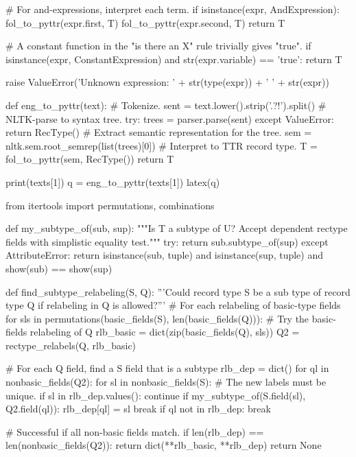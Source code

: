 \begin{cell}
    # For and-expressions, interpret each term.
    if isinstance(expr, AndExpression):
        fol_to_pyttr(expr.first, T)
        fol_to_pyttr(expr.second, T)
        return T
    
    # A constant function in the "is there an X" rule trivially gives "true".
    if isinstance(expr, ConstantExpression) and str(expr.variable) == 'true':
        return T
    
    raise ValueError('Unknown expression: ' + str(type(expr)) + ' ' + str(expr))

def eng_to_pyttr(text):
    # Tokenize.
    sent = text.lower().strip('.?!').split()
    # NLTK-parse to syntax tree.
    try:
        trees = parser.parse(sent)
    except ValueError:
        return RecType()
    # Extract semantic representation for the tree.
    sem = nltk.sem.root_semrep(list(trees)[0])
    # Interpret to TTR record type.
    T = fol_to_pyttr(sem, RecType())
    return T

print(texts[1])
q = eng_to_pyttr(texts[1])
latex(q)
\end{cell}

\begin{cell}
from itertools import permutations, combinations

def my_subtype_of(sub, sup):
    """Is T a subtype of U? Accept dependent rectype fields with simplistic equality test."""
    try:
        return sub.subtype_of(sup)
    except AttributeError:
        return isinstance(sub, tuple) and isinstance(sup, tuple) and show(sub) == show(sup)

def find_subtype_relabeling(S, Q):
    '''Could record type S be a sub type of record type Q if relabeling in Q is allowed?'''
    # For each relabeling of basic-type fields
    for sls in permutations(basic_fields(S), len(basic_fields(Q))):
        # Try the basic-fields relabeling of Q
        rlb_basic = dict(zip(basic_fields(Q), sls))
        Q2 = rectype_relabels(Q, rlb_basic)
        
        # For each Q field, find a S field that is a subtype
        rlb_dep = dict()
        for ql in nonbasic_fields(Q2):
            for sl in nonbasic_fields(S):
                # The new labels must be unique.
                if sl in rlb_dep.values(): continue
                if my_subtype_of(S.field(sl), Q2.field(ql)):
                    rlb_dep[ql] = sl
                    break
            if ql not in rlb_dep:
                break

        # Successful if all non-basic fields match.
        if len(rlb_dep) == len(nonbasic_fields(Q2)):
            return dict(**rlb_basic, **rlb_dep)
    return None
\end{cell}

